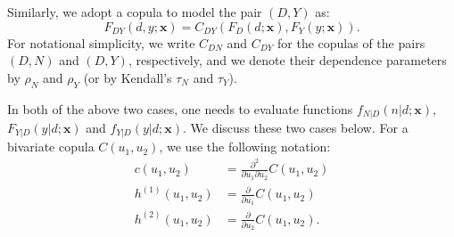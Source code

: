 \documentclass[11pt]{article}
\begin{document}
Similarly, we adopt a copula to model the pair {$(D,Y)$} as:
\begin{equation}  \label{eq:SevCopula}
	F_{DY}(d,y;\bm{x}) = C_{DY}(F_D(d;\bm{x}),F_{Y}(y;\bm{x})).
\end{equation}
{For notational simplicity, we write $C_{DN}$ and $C_{DY}$ for the copulas of the pairs $(D,N)$ and $(D,Y)$, respectively, and we denote their dependence parameters by $\rho_N$ and $\rho_Y$ (or by Kendall's $\tau_N$ and $\tau_Y$).}

In both of the above two cases, one needs to evaluate functions {$f_{N|D}(n|d;\bm{x})$, $F_{Y|D}(y|d;\bm{x})$ and $f_{Y|D}(y|d;\bm{x})$}. We discuss these two cases below. For a bivariate copula $C(u_1,u_2)$, we use the following notation:
\begin{align*}
	c(u_1,u_2)& = \frac{\partial^2}{\partial u_1\partial u_2} C(u_1,u_2) \\
	h^{(1)}(u_1,u_2)& = \frac{\partial}{\partial u_1} C(u_1,u_2) \\
	h^{(2)}(u_1,u_2)& = \frac{\partial}{\partial u_2} C(u_1,u_2).
\end{align*}
\end{document}
